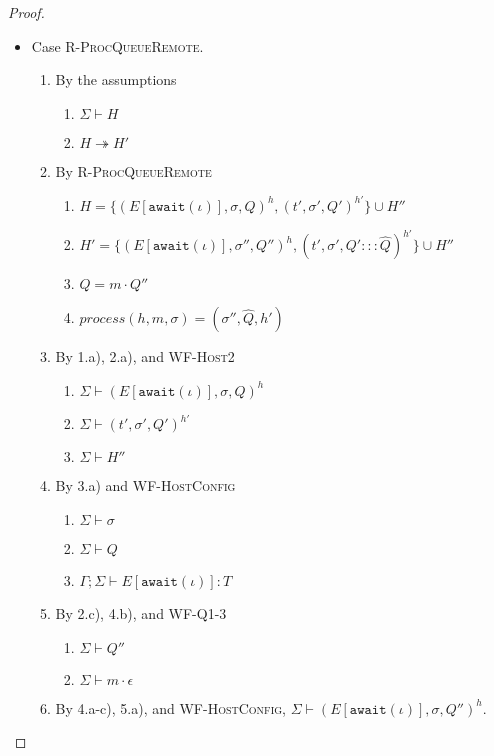 \documentclass{article}
\theoremstyle{definition}
\begin{document}
\begin{proof}
\begin{itemize}
\item Case \textsc{R-ProcQueueRemote}.
\begin{enumerate}
\item By the assumptions
  \begin{enumerate}[label=(\alph*)]
  \item $\Sigma \vdash H$
  \item $H \twoheadrightarrow H'$
  \end{enumerate}
\item By \textsc{R-ProcQueueRemote}
  \begin{enumerate}[label=(\alph*)]
  \item $H = \{ (E[\texttt{await}(\iota)], \sigma, Q)^h, (t', \sigma', Q')^{h'} \} \cup H''$
  \item $H' = \{ (E[\texttt{await}(\iota)], \sigma'', Q'')^h, (t', \sigma', Q' ::: \hat{Q})^{h'} \} \cup H''$
  \item $Q        = m \cdot Q''$
  \item $process(h, m, \sigma) = (\sigma'', \hat{Q}, h')$
  \end{enumerate}
\item By 1.a), 2.a), and \textsc{WF-Host2}
  \begin{enumerate}[label=(\alph*)]
  \item $\Sigma \vdash (E[\texttt{await}(\iota)], \sigma, Q)^h$
  \item $\Sigma \vdash (t', \sigma', Q')^{h'}$
  \item $\Sigma \vdash H''$
  \end{enumerate}
\item By 3.a) and \textsc{WF-HostConfig}
  \begin{enumerate}[label=(\alph*)]
  \item $\Sigma \vdash \sigma$
  \item $\Sigma \vdash Q$
  \item $\Gamma ; \Sigma \vdash E[\texttt{await}(\iota)] : T$
  \end{enumerate}
\item By 2.c), 4.b), and \textsc{WF-Q1-3}
  \begin{enumerate}[label=(\alph*)]
  \item $\Sigma \vdash Q''$
  \item $\Sigma \vdash m \cdot \epsilon$
  \end{enumerate}
\item By 4.a-c), 5.a), and \textsc{WF-HostConfig}, $\Sigma \vdash (E[\texttt{await}(\iota)], \sigma, Q'')^h$.

\end{enumerate}
\end{itemize}
\end{proof}
\end{document}

